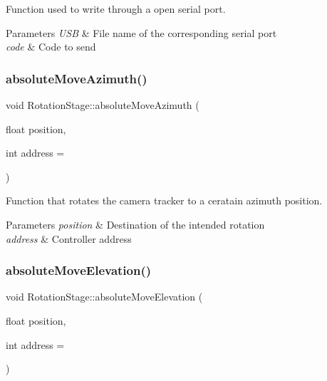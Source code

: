 Function used to write through a open serial port. 


\begin{DoxyParams}{Parameters}
{\em U\+SB} & File name of the corresponding serial port \\
\hline
{\em code} & Code to send \\
\hline
\end{DoxyParams}
\mbox{\label{class_rotation_stage_a71cedba1bf3aba55bc3db7254e83b449}} 
\subsubsection{\texorpdfstring{absolute\+Move\+Azimuth()}{absoluteMoveAzimuth()}}
{\footnotesize\ttfamily void Rotation\+Stage\+::absolute\+Move\+Azimuth (\begin{DoxyParamCaption}\item[{float}]{position,  }\item[{int}]{address = {} }\end{DoxyParamCaption})}



Function that rotates the camera tracker to a ceratain azimuth position. 


\begin{DoxyParams}{Parameters}
{\em position} & Destination of the intended rotation \\
\hline
{\em address} & Controller address \\
\hline
\end{DoxyParams}
\mbox{\label{class_rotation_stage_ad51e21e68642e5e23089f431d1242dea}} 
\subsubsection{\texorpdfstring{absolute\+Move\+Elevation()}{absoluteMoveElevation()}}
{\footnotesize\ttfamily void Rotation\+Stage\+::absolute\+Move\+Elevation (\begin{DoxyParamCaption}\item[{float}]{position,  }\item[{int}]{address = {} }\end{DoxyParamCaption})}



